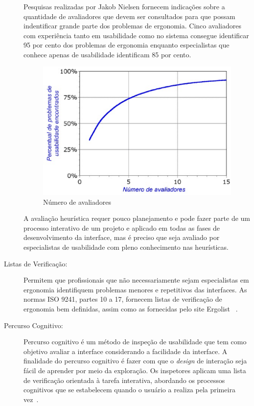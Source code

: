\begin{description}
	Pesquisas realizadas por Jakob Nielsen fornecem indicações sobre a quantidade de avaliadores que devem ser consultados para que possam indentificar grande parte dos problemas de ergonomia. Cinco avaliadores com experiência tanto em usabilidade como no sistema consegue identificar 95 por cento dos problemas de ergonomia enquanto especialistas que conhece apenas de usabilidade identificam 85 por cento.

\begin{figure}[h]
    \centering
    \includegraphics[keepaspectratio=true,scale=0.60]
      {figuras/avaliadores_heuristica.eps}
    \caption{Número de avaliadores~\cite{nielsen1994}}
    \label{avaliadores}
\end{figure}

	A avaliação heurística requer pouco planejamento e pode fazer parte de um processo interativo de um projeto e aplicado em todas as fases de desenvolvimento da interface, mas é preciso que seja avaliado por especialistas de usabilidade com pleno conhecimento nas heurísticas.
	

\item[Listas de Verificação:]

	Permitem que profissionais que não necessariamente sejam especialistas em ergonomia identifiquem problemas menores e repetitivos das interfaces. As normas ISO 9241, partes 10 a 17, fornecem listas de verificação de ergonomia bem definidas, assim como as fornecidas pelo site Ergolist ~\cite{cybis2010}.
	

\item[Percurso Cognitivo:]

Percurso cognitivo é um método de inspeção de usabilidade que tem como objetivo avaliar a interface considerando a facilidade da interface. A finalidade do percurso cognitivo é fazer com que o \emph{design} de interação seja fácil de aprender por meio da exploração. Os inspetores aplicam uma lista de verificação orientada à tarefa interativa, abordando os processos cognitivos que se estabelecem quando o usuário a realiza pela primeira vez~\cite{cybis2010}.



\end{description}

